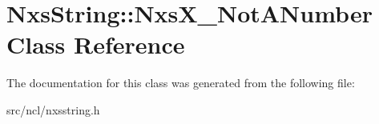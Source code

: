 \hypertarget{classNxsString_1_1NxsX__NotANumber}{
\section{NxsString::NxsX\_\-NotANumber Class Reference}
\label{classNxsString_1_1NxsX__NotANumber}
}


The documentation for this class was generated from the following file:\begin{DoxyCompactItemize}
\item 
src/ncl/nxsstring.h\end{DoxyCompactItemize}

